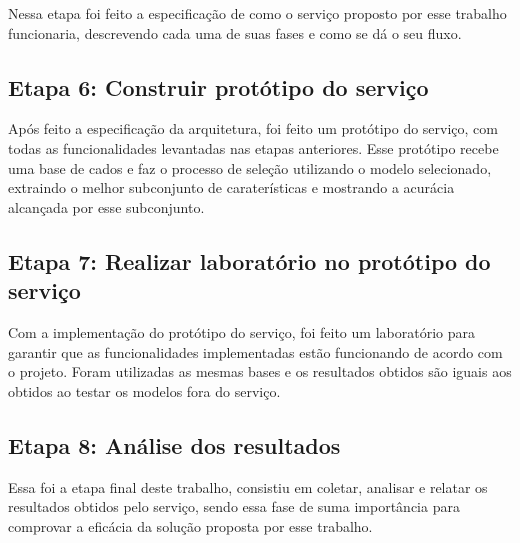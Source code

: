 Nessa etapa foi feito a especificação de como o serviço proposto por esse trabalho funcionaria, descrevendo cada uma de suas fases e como se dá o seu fluxo.

\subsection{Etapa 6: Construir protótipo do serviço}

Após feito a especificação da arquitetura, foi feito um protótipo do serviço, com todas as funcionalidades levantadas nas etapas anteriores. Esse protótipo recebe uma base de cados e faz o processo de seleção utilizando o modelo selecionado, extraindo o melhor subconjunto de caraterísticas e mostrando a acurácia alcançada por esse subconjunto.

\subsection{Etapa 7: Realizar laboratório no protótipo do serviço}
Com a implementação do protótipo do serviço, foi feito um laboratório para garantir que as funcionalidades implementadas estão funcionando de acordo com o projeto. Foram utilizadas as mesmas bases e os resultados obtidos são iguais aos obtidos ao testar os modelos fora do serviço.

\subsection{Etapa 8: Análise dos resultados}

Essa foi a etapa final deste trabalho, consistiu em coletar, analisar e relatar os resultados obtidos pelo serviço, sendo essa fase de suma importância para comprovar a eficácia da solução proposta por esse trabalho.

